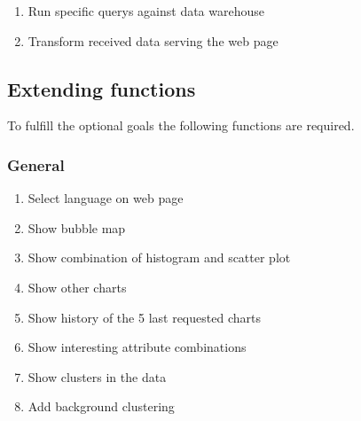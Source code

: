 \begin{enumerate}[resume*=func]
  
  \item Run specific \glspl{query} against \gls{data warehouse} \label{f20}
  
  \item Transform received data serving the web page \label{f21}

\end{enumerate}


\subsection{Extending functions}

To fulfill the optional goals the following functions are required.

\subsubsection*{General}
\begin{enumerate}[resume*=func]
  
  \item Select language on web page \label{f22}
  
  \item Show bubble map \label{f23} %
  
  \item Show combination of \gls{histogram} and \gls{scatter plot} \label{f24}
  
  \item Show other \glspl{chart} \label{f25}
  
  \item Show history of the 5 last requested \glspl{chart}  \label{f26}
  \item Show interesting attribute combinations

  \item Show clusters in the data
  
  \item Add background clustering
  


 
\end{enumerate}



